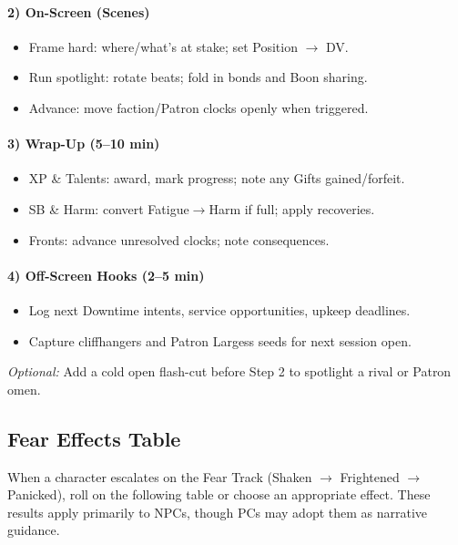 \paragraph{2) On-Screen (Scenes)}
\begin{itemize}
  \item Frame hard: where/what’s at stake; set Position $\to$ DV.
  \item Run spotlight: rotate beats; fold in bonds and Boon sharing.
  \item Advance: move faction/Patron clocks openly when triggered.
\end{itemize}

\paragraph{3) Wrap-Up (5–10 min)}
\begin{itemize}
  \item XP \& Talents: award, mark progress; note any Gifts gained/forfeit.
  \item SB \& Harm: convert Fatigue$\to$Harm if full; apply recoveries.
  \item Fronts: advance unresolved clocks; note consequences.
\end{itemize}

\paragraph{4) Off-Screen Hooks (2–5 min)}
\begin{itemize}
  \item Log next Downtime intents, service opportunities, upkeep deadlines.
  \item Capture cliffhangers and Patron Largess seeds for next session open.
\end{itemize}

\emph{Optional:} Add a cold open flash-cut before Step 2 to spotlight a rival or Patron omen.

\subsection{Fear Effects Table}
\label{subsec:fear-table}

When a character escalates on the Fear Track (Shaken $\rightarrow$ Frightened $\rightarrow$ Panicked), roll on the following table or choose an appropriate effect. These results apply primarily to NPCs, though PCs may adopt them as narrative guidance.


